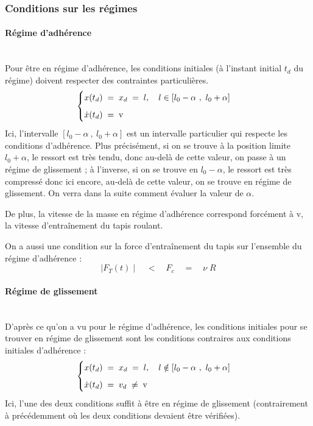 \documentclass{article}
\newcommand{\ts}{\scriptscriptstyle}
\begin{document}
\subsubsection{Conditions sur les régimes}\label{sssec_1.1.1}

\paragraph{Régime d'adhérence}\label{par_1.1.1.1}
\mbox{}\\
Pour être en régime d'adhérence, les conditions initiales (à l'instant initial $t_d$ du régime) doivent respecter des contraintes particulières.
%
\begin{align*}
\begin{cases}
\vspace{.2cm}
x(t_d)\;=\; x_d\;=\; l,\quad l\in [l_0-\alpha~,~l_0+\alpha]\\
\dot{x}(t_d)\;=\;\text{v} 
\end{cases}
\end{align*}
%
Ici, l'intervalle $[l_0-\alpha~,~l_0+\alpha]$ est un intervalle particulier qui respecte les conditions d'adhérence. Plus précisément, si on se trouve à la position limite $l_0+\alpha$, le ressort est très tendu, donc au-delà de cette valeur, on passe à un régime de glissement ; à l'inverse, si on se trouve en $l_0-\alpha$, le ressort est très compressé donc ici encore, au-delà de cette valeur, on se trouve en régime de glissement. On verra dans la suite comment évaluer la valeur de $\alpha$.

De plus, la vitesse de la masse en régime d'adhérence correspond forcément à v, la vitesse d'entraînement du tapis roulant.   

On a aussi une condition sur la force d'entraînement du tapis sur l'ensemble du régime d'adhérence :
%
\begin{equation}
\mid F_{\ts{T}}(t) \mid  \quad<\quad F_c \quad=\quad\nu\; R \label{eq_2}
\end{equation}
%
\paragraph{Régime de glissement}\label{par_1.1.1.2}
\mbox{}\\
D'après ce qu'on a vu pour le régime d'adhérence, les conditions initiales pour se trouver en régime de glissement sont les conditions contraires aux conditions initiales d'adhérence :
%
\begin{align*}
\begin{cases}
\vspace{.2cm}
x(t_d)\;=\;x_d\;=\;l,\quad l\notin [l_0-\alpha~,~l_0+\alpha]\\
\dot{x}(t_d)\;=\;v_d\;\neq\; \text{v}
\end{cases}
\end{align*}
%
Ici, l'une des deux conditions suffit à être en régime de glissement (contrairement à précédemment où les deux conditions devaient être vérifiées).  
\end{document}
